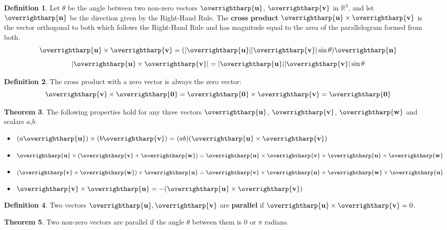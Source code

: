 \documentclass[letterpaper, twoside, 12pt]{book}
\newcommand{\<}{\langle}
\renewcommand{\>}{\rangle}
\theoremstyle{definition}
\newtheorem{theorem}{Theorem}
\theoremstyle{definition}
\newtheorem{definition}[theorem]{Definition}
\newcommand{\harpvec}[1]{\overrightharp{\ensuremath{\mathbf{#1}}}}
\begin{document}
  \begin{definition}
    Let $\theta$ be the angle between two non-zero vectors $\harpvec{u}$,
    $\harpvec{v}$ in $\mathbb{R}^3$, and let $\harpvec{n}$ be the direction
    given by the Right-Hand Rule.
    The \textbf{cross product} $\harpvec{u}\times\harpvec{v}$ is the vector
    orthogonal to both which follows the Right-Hand Rule and has magnitude
    equal to the area of the parallelogram formed from both.
    \[
      \harpvec{u}\times\harpvec{v}
        =
      (|\harpvec{u}||\harpvec{v}|\sin\theta)\harpvec{n}
    \]
    \[
      |\harpvec{u}\times\harpvec{v}|
        =
      |\harpvec{u}||\harpvec{v}|\sin\theta
    \]
  \end{definition}

  \begin{definition}
    The cross product with a zero vector is always the zero vector:
    \[\harpvec{v}\times\harpvec{0}=\harpvec{0}\times\harpvec{v}=\harpvec{0}\]
  \end{definition}

  \begin{theorem}
    The following properties hold for any three vectors $\harpvec{u}$, $\harpvec{v}$,
    $\harpvec{w}$ and scalars $a$,$b$.
    \begin{itemize}
    \item $(a\harpvec{u}) \times (b\harpvec{v}) = (ab)(\harpvec{u} \times \harpvec{v})$
    \item
      $\harpvec{u} \times (\harpvec{v} + \harpvec{w}) =
      \harpvec{u} \times \harpvec{v} + \harpvec{u} \times \harpvec{w}$
    \item
      $(\harpvec{v} + \harpvec{w}) \times \harpvec{u} =
      \harpvec{v} \times \harpvec{u} + \harpvec{w} \times \harpvec{u}$
    \item $\harpvec{v} \times \harpvec{u} = -(\harpvec{u} \times \harpvec{v})$
    \end{itemize}
  \end{theorem}

  \begin{definition}
    Two vectors $\harpvec{u},\harpvec{v}$ are \textbf{parallel} if
    $\harpvec{u} \times \harpvec{v} = 0$.
  \end{definition}

  \begin{theorem}
    Two non-zero vectors are parallel if the angle $\theta$ between them
    is $0$ or $\pi$ radians.
  \end{theorem}
\end{document}
